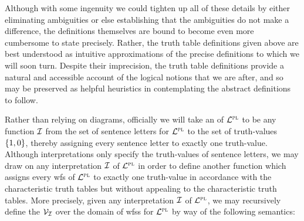 Although with some ingenuity we could tighten up all of these details by either eliminating ambiguities or else establishing that the ambiguities do not make a difference, the definitions themselves are bound to become even more cumbersome to state precisely.
Rather, the truth table definitions given above are best understood as intuitive approximations of the precise definitions to which we will soon turn.
Despite their imprecision, the truth table definitions provide a natural and accessible account of the logical notions that we are after, and so may be preserved as helpful heuristics in contemplating the abstract definitions to follow.


Rather than relying on diagrams, officially we will take an  of $\mathcal{L}^{\textsc{pl}}$ to be any function $\mathcal{I}$ from the set of sentence letters for $\mathcal{L}^{\textsc{pl}}$ to the set of truth-values $\lbrace1, 0\rbrace$, thereby assigning every sentence letter to exactly one truth-value.
Although interpretations only specify the truth-values of sentence letters, we may draw on any interpretation $\mathcal{I}$ of $\mathcal{L}^{\textsc{pl}}$ in order to define another function which assigns every wfs of $\mathcal{L}^{\textsc{pl}}$ to exactly one truth-value in accordance with the characteristic truth tables but without appealing to the characteristic truth tables.
More precisely, given any interpretation $\mathcal{I}$ of $\mathcal{L}^{\textsc{pl}}$, we may recursively define the  $\mathcal{V}_{\mathcal{I}}$ over the domain of wfss for $\mathcal{L}^{\textsc{pl}}$ by way of the following semantics: %


